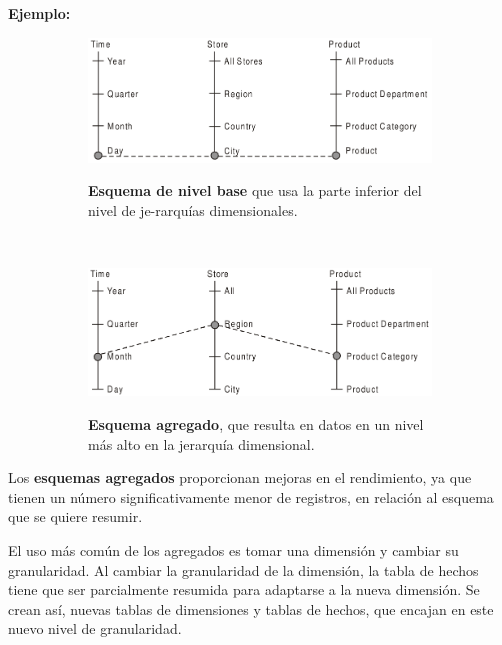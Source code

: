\documentclass{fancyslides}
\begin{document}
\begin{frame}
\misc
{
\textbf{Ejemplo:}
\begin{figure}
        \centering
        \begin{subfigure}[b]{0.5\textwidth}
                \includegraphics[width=\textwidth]{ej1_agregados}

                \textbf{Esquema de nivel base} que usa la parte inferior del nivel de je-rarquías dimensionales.
        \end{subfigure}%
        ~ \quad
        \begin{subfigure}[b]{0.5\textwidth}
                \includegraphics[width=\textwidth]{ej2_agregados}
                
                \textbf{Esquema agregado}, que resulta en datos en un nivel más alto en la jerarquía dimensional.
        \end{subfigure}
\end{figure}

Los \textbf{esquemas agregados} proporcionan mejoras en el rendimiento, ya que tienen un número significativamente menor de registros,
en relación al esquema que se quiere resumir.

}
\end{frame}

\begin{frame}
\misc
{
El uso más común de los agregados es tomar una dimensión y cambiar su granularidad.
Al cambiar la granularidad de la dimensión, la tabla de hechos tiene que ser parcialmente resumida para adaptarse a la nueva dimensión. Se crean así, nuevas tablas de dimensiones y tablas de hechos, que encajan en este nuevo nivel de granularidad.
}
\end{frame}
\end{document}
